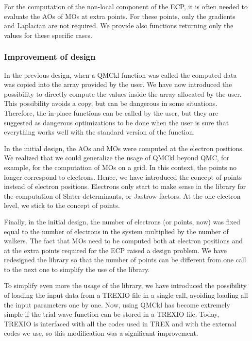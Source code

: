 For the computation of the non-local component of the
\ac{ECP}, it is often needed to evaluate the \acp{AO} of
\acp{MO} at extra points. For these points, only the gradients and
Laplacian are not required. We provide also functions returning only
the values for these specific cases.


\subsubsection{Improvement of design}

In the previous design, when a QMCkl function was called the computed
data was copied into the array provided by the user. We have now
introduced the possibility to directly compute the values inside the
array allocated by the user. This possibility avoids a copy, but
can be dangerous in some situations. Therefore, the in-place functions
can be called by the user, but they are suggested as dangerous
optimizations to be done when the user is sure that everything works
well with the standard version of the function.

In the initial design, the \acp{AO} and \acp{MO} were computed at the
electron positions. We realized that we could generalize the
usage of QMCkl beyond QMC, for example, for the computation of \acp{MO} on a grid.
In this context, the points no longer correspond to electrons.
Hence, we have introduced the concept of points instead of electron
positions. Electrons only start to make sense in the library for the
computation of Slater determinants, or Jastrow factors. At the
one-electron level, we stick to the concept of points.

Finally, in the initial design, the number of electrons (or points,
now) was fixed equal to the number of electrons in the system
multiplied by the number of walkers. The fact that \acp{MO} need to be
computed both at electron positions and at the extra points required
for the \ac{ECP} raised a design problem. We have redesigned
the library so that the number of points can be different from one
call to the next one to simplify the use of the library.

To simplify even more the usage of the library, we have introduced the
possibility of loading the input data from a TREXIO file in a single
call, avoiding loading all the input parameters one by one. Now, using
QMCkl has become extremely simple if the trial wave function can be
stored in a TREXIO file. Today, TREXIO is interfaced with all the
codes used in TREX and with the external codes we use, so this
modification was a significant improvement.

